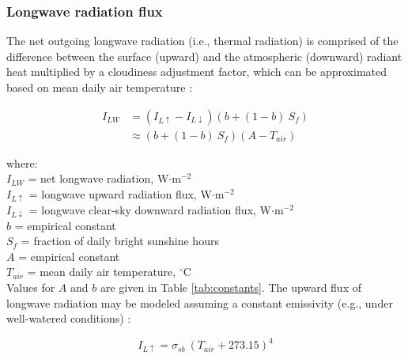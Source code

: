 \subsubsection{Longwave radiation flux}
\label{sec:rl}
The net outgoing longwave radiation (i.e., thermal radiation) is comprised of the difference between the surface (upward) and the atmospheric (downward) radiant heat multiplied by a cloudiness adjustment factor, which can be approximated based on mean daily air temperature \parencite{linacre68}:

\begin{equation}
\label{eq:rnl}
	\begin{split}
		I_{LW} & = \left(I_{L\uparrow} - I_{L\downarrow} \right) 
		         \left(b + (1-b)\: S_f \right) \\
		       & \approx \left(b + (1-b)\: S_f \right) 
		         \left(A - T_{air} \right)
	\end{split}
\end{equation}

\noindent where: \\
\indent $I_{LW}$ = net longwave radiation, W$\cdot$m$^{-2}$ \\
\indent $I_{L\uparrow}$ = longwave upward radiation flux, W$\cdot$m$^{-2}$\\
\indent $I_{L\downarrow}$ = longwave clear-sky downward radiation flux, W$\cdot$m$^{-2}$\\
\indent $b$ = empirical constant\\
\indent $S_f$ = fraction of daily bright sunshine hours \\
\indent $A$ = empirical constant \\
\indent $T_{air}$ = mean daily air temperature, $^{\circ}$C \\

\noindent Values for $A$ and $b$ are given in Table \ref{tab:constants}. 
The upward flux of longwave radiation may be modeled assuming a constant emissivity (e.g., under well-watered conditions) \parencite[Eq. 21]{linacre68}:

\begin{equation}
\label{eq:rlu}
	I_{L\uparrow} = \sigma_{sb}\: \left(T_{air} + 273.15\right)^4
\end{equation}

